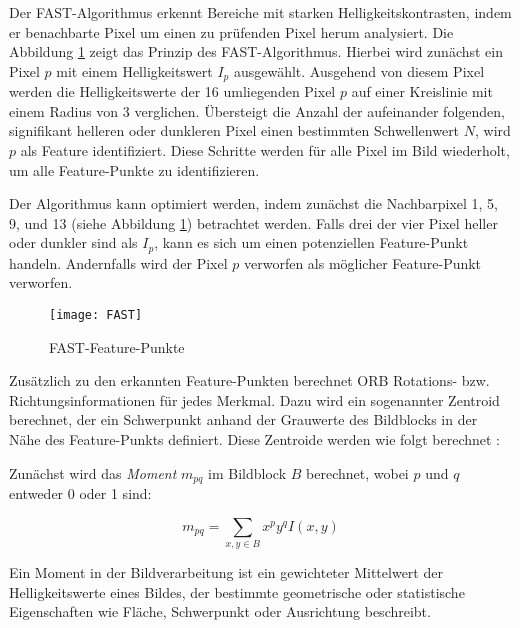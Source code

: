 Der FAST-Algorithmus erkennt Bereiche mit starken Helligkeitskontrasten, indem er benachbarte Pixel um einen zu prüfenden Pixel herum analysiert. Die Abbildung \ref{fig:FAST} zeigt das Prinzip des FAST-Algorithmus. Hierbei wird zunächst ein Pixel \( p \) mit einem Helligkeitswert \( I_p \) ausgewählt. Ausgehend von diesem Pixel werden die Helligkeitswerte der 16 umliegenden Pixel \( p \) auf einer Kreislinie mit einem Radius von 3 verglichen. Übersteigt die Anzahl der aufeinander folgenden, signifikant helleren oder dunkleren Pixel einen bestimmten Schwellenwert \( N \), wird \( p \) als Feature identifiziert. Diese Schritte werden für alle Pixel im Bild wiederholt, um alle Feature-Punkte zu identifizieren. 

Der Algorithmus kann optimiert werden, indem zunächst die Nachbarpixel 1, 5, 9, und 13 (siehe Abbildung \ref{fig:FAST}) betrachtet werden. Falls drei der vier Pixel heller oder dunkler sind als \( I_p \), kann es sich um einen potenziellen Feature-Punkt handeln. Andernfalls wird der Pixel \( p \) verworfen als möglicher Feature-Punkt verworfen. \cite{gao2021vSLAM, rublee2011orb, rosten2006fast}

\begin{figure}
    \centering
    \texttt{[image: FAST]}
    \caption{FAST-Feature-Punkte \cite{rosten2006fast}\label{fig:FAST}}\par
\end{figure}

Zusätzlich zu den erkannten Feature-Punkten berechnet ORB Rotations- bzw. Richtungsinformationen für jedes Merkmal. Dazu wird ein sogenannter Zentroid berechnet, der ein Schwerpunkt anhand der Grauwerte des Bildblocks in der Nähe des Feature-Punkts definiert. Diese Zentroide werden wie folgt berechnet \cite{gao2021vSLAM, rublee2011orb}:

Zunächst wird das \emph{Moment} \( m_{pq} \) im Bildblock \( B \) berechnet, wobei \( p \) und \( q \) entweder 0 oder 1 sind:

\begin{equation}
    m_{pq} = \sum_{x,y \in B} x^p y^q I(x, y)
\end{equation}

\begin{tcolorbox}[colback=THAi-Blue!20!white, colframe=THAi-Blue]
    Ein Moment in der Bildverarbeitung ist ein gewichteter Mittelwert der Helligkeitswerte eines Bildes, der bestimmte geometrische oder statistische Eigenschaften wie Fläche, Schwerpunkt oder Ausrichtung beschreibt. \cite{wikipedia2024moment}
\end{tcolorbox}

